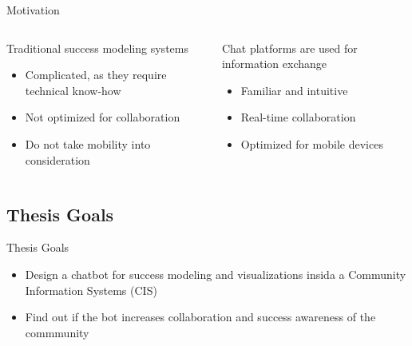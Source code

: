 \begin{frame}{Motivation}
  \begin{columns}
    \begin{column}[]{0.5\textwidth}

      Traditional success modeling systems
      \begin{itemize}
        \item Complicated, as they require technical know-how
        \item Not optimized for collaboration
        \item Do not take mobility into consideration
      \end{itemize}

    \end{column}
    \begin{column}[]{0.5\textwidth}
      Chat platforms are used for information exchange
      \begin{itemize}
        \item Familiar and intuitive
        \item Real-time collaboration
        \item Optimized for mobile devices
      \end{itemize}
    \end{column}
  \end{columns}

\end{frame}


\subsection{Thesis Goals}

\begin{frame}{Thesis Goals}
  \begin{itemize}
    \item Design a chatbot for success modeling and visualizations
          insida a Community Information Systems (CIS)
    \item Find out if the bot increases collaboration and success awareness of the commmunity %
  \end{itemize}
\end{frame}


